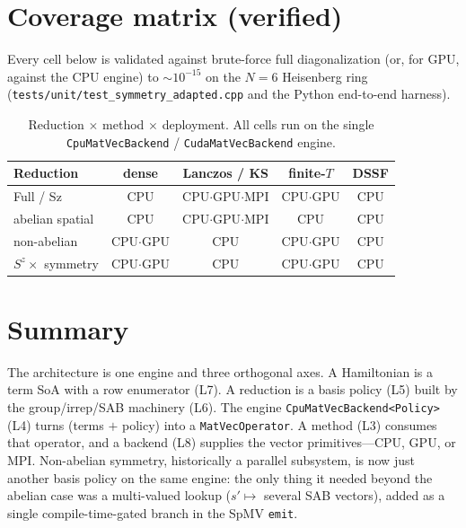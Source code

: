 \documentclass[11pt]{article}
\newcommand{\code}[1]{\texttt{\small #1}}
\newcommand{\file}[1]{\texttt{\footnotesize #1}}
\begin{document}
\section{Coverage matrix (verified)}

Every cell below is validated against brute-force full diagonalization
(or, for GPU, against the CPU engine) to $\sim 10^{-15}$ on the $N=6$
Heisenberg ring (\file{tests/unit/test\_symmetry\_adapted.cpp} and the
Python end-to-end harness).

\begin{table}[h]
\centering\small
\begin{tabular}{@{}lcccc@{}}
\toprule
Reduction & dense & Lanczos / KS & finite-$T$ & DSSF \\
\midrule
Full / Sz            & CPU            & CPU$\cdot$GPU$\cdot$MPI & CPU$\cdot$GPU & CPU \\
abelian spatial      & CPU            & CPU$\cdot$GPU$\cdot$MPI & CPU & CPU \\
non-abelian          & CPU$\cdot$GPU  & CPU            & CPU$\cdot$GPU & CPU \\
$S^z\times$ symmetry & CPU$\cdot$GPU  & CPU            & CPU$\cdot$GPU & CPU \\
\bottomrule
\end{tabular}
\caption{Reduction $\times$ method $\times$ deployment. All cells run on the
single \code{CpuMatVecBackend} / \code{CudaMatVecBackend} engine.}
\end{table}

\section{Summary}

The architecture is one engine and three orthogonal axes. A Hamiltonian
is a term SoA with a row enumerator (L7). A reduction is a basis policy
(L5) built by the group/irrep/SAB machinery (L6). The engine
\code{CpuMatVecBackend<Policy>} (L4) turns (terms $+$ policy) into a
\code{MatVecOperator}. A method (L3) consumes that operator, and a
backend (L8) supplies the vector primitives---CPU, GPU, or MPI. Non-abelian
symmetry, historically a parallel subsystem, is now just another basis
policy on the same engine: the only thing it needed beyond the abelian
case was a multi-valued lookup ($s' \mapsto$ several SAB vectors), added
as a single compile-time-gated branch in the SpMV \code{emit}.
\end{document}

